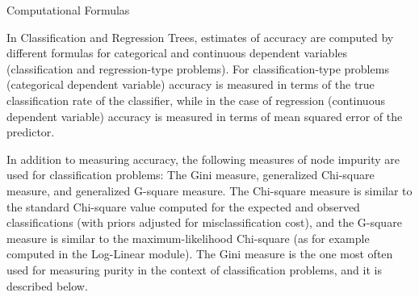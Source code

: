 Computational Formulas

In Classification and Regression Trees, estimates of accuracy are computed by different formulas for categorical and continuous dependent variables (classification and regression-type problems). For classification-type problems (categorical dependent variable) accuracy is measured in terms of the true classification rate of the classifier, while in the case of regression (continuous dependent variable) accuracy is measured in terms of mean squared error of the predictor.

In addition to measuring accuracy, the following measures of node impurity are used for classification problems: The Gini measure, generalized Chi-square measure, and generalized G-square measure. The Chi-square measure is similar to the standard Chi-square value computed for the expected and observed classifications (with priors adjusted for misclassification cost), and the G-square measure is similar to the maximum-likelihood Chi-square (as for example computed in the Log-Linear module). The Gini measure is the one most often used for measuring purity in the context of classification problems, and it is described below.
